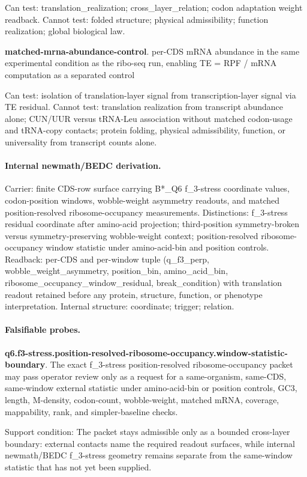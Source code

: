 Can test: translation\_realization; cross\_layer\_relation; codon adaptation weight readback. Cannot test: folded structure; physical admissibility; function realization; global biological law.

\textbf{matched-mrna-abundance-control}. per-CDS mRNA abundance in the same experimental condition as the ribo-seq run, enabling TE = RPF / mRNA computation as a separated control

Can test: isolation of translation-layer signal from transcription-layer signal via TE residual. Cannot test: translation realization from transcript abundance alone; CUN/UUR versus tRNA-Leu association without matched codon-usage and tRNA-copy contacts; protein folding, physical admissibility, function, or universality from transcript counts alone.

\paragraph{Internal newmath/BEDC derivation.} Carrier: finite CDS-row surface carrying B*\_Q6 f\_3-stress coordinate values, codon-position windows, wobble-weight asymmetry readouts, and matched position-resolved ribosome-occupancy measurements. Distinctions: f\_3-stress residual coordinate after amino-acid projection; third-position symmetry-broken versus symmetry-preserving wobble-weight context; position-resolved ribosome-occupancy window statistic under amino-acid-bin and position controls. Readback: per-CDS and per-window tuple (q\_f3\_perp, wobble\_weight\_asymmetry, position\_bin, amino\_acid\_bin, ribosome\_occupancy\_window\_residual, break\_condition) with translation readout retained before any protein, structure, function, or phenotype interpretation. Internal structure: coordinate; trigger; relation.

\paragraph{Falsifiable probes.}
\textbf{q6.f3-stress.position-resolved-ribosome-occupancy.window-statistic-boundary}. The exact f\_3-stress position-resolved ribosome-occupancy packet may pass operator review only as a request for a same-organism, same-CDS, same-window external statistic under amino-acid-bin or position controls, GC3, length, M-density, codon-count, wobble-weight, matched mRNA, coverage, mappability, rank, and simpler-baseline checks.

Support condition: The packet stays admissible only as a bounded cross-layer boundary: external contacts name the required readout surfaces, while internal newmath/BEDC f\_3-stress geometry remains separate from the same-window statistic that has not yet been supplied.

